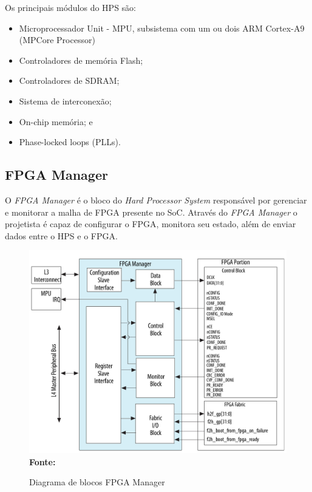 Os principais módulos do HPS são:

\begin{itemize}
    \item Microprocessador Unit - MPU, subsistema com um ou dois ARM Cortex-A9 (MPCore Processor)
    \item Controladores de memória Flash;
    \item Controladores de SDRAM;
    \item Sistema de interconexão;
    \item On-chip memória; e
    \item Phase-locked loops (PLLs).
\end{itemize}


\subsection{FPGA Manager}
O \textit{FPGA Manager} é o bloco do \textit{Hard Processor System} responsável por gerenciar e monitorar a malha de FPGA presente no SoC. Através do \textit{FPGA Manager} o projetista é capaz de configurar o FPGA, monitora seu estado, além de enviar dados entre o HPS e o FPGA\@. 

\begin{figure}[ht]
	\caption{Diagrama de blocos FPGA Manager }
	\begin{center}
		\includegraphics[scale=0.3]{imagens/fpgamanager.png}\\
		{\small \textbf{Fonte:} }
    \end{center}\label{fig:fpgamanager}
\end{figure}

